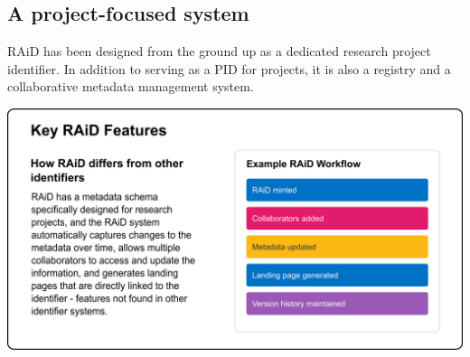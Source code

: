 \documentclass[a0,portrait]{a0poster}
\newenvironment{Figure}
  {\par\medskip\noindent\minipage{\linewidth}}
  {\endminipage\par\medskip}
\begin{document}
\begin{multicols}{3}

\color{ARDCPurple}
\section*{\LARGE A project-focused system}
\color{DarkGrey}
\large{
RAiD has been designed from the ground up as a dedicated research project identifier. In addition to serving as a PID for projects, it is also a registry and a collaborative metadata management system.
}

\vspace{0.5cm}

\begin{Figure}
  \centering
  \includegraphics[width=0.9\linewidth]{figures/raid-key-features.png}
  \label{key-features}
\end{Figure}


% 



\end{multicols}
\end{document}
